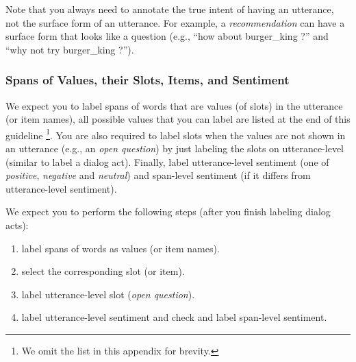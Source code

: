 \documentclass[11pt,a4paper]{article}
\begin{document}
Note that you always need to annotate the true intent of having an utterance, not the surface form of an utterance. For example, a \textit{recommendation} can have a surface form that looks like a question (e.g., ``how about burger\_king ?'' %
and ``why not try burger\_king ?'').

\subsubsection{Spans of Values, their Slots, Items, and Sentiment}
We expect you to label spans of words that are values (of slots) in the utterance (or item names), all possible values that you can label are listed at the end of this guideline \footnote{We omit the list in this appendix for brevity.}. You are also required to label slots when the values are not shown in an utterance (e.g., an \textit{open question}) by just labeling the slots on utterance-level (similar to label a dialog act). Finally, label utterance-level sentiment (one of \textit{positive}, \textit{negative} and \textit{neutral}) and span-level sentiment (if it differs from utterance-level sentiment).

We expect you to perform the following steps (after you finish labeling dialog acts): 
\begin{enumerate}
\itemsep0em
    \item label spans of words as values (or item names).
    \item select the corresponding slot (or item).
    \item label utterance-level slot (\textit{open question}).
    \item label utterance-level sentiment and check and label span-level sentiment.
\end{enumerate}
\end{document}
